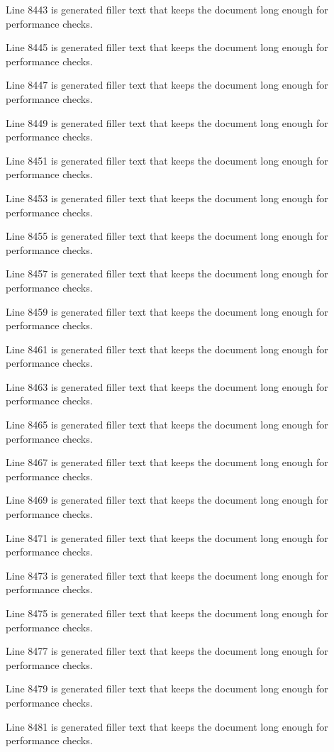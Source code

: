 Line 8443 is generated filler text that keeps the document long enough for performance checks.

Line 8445 is generated filler text that keeps the document long enough for performance checks.

Line 8447 is generated filler text that keeps the document long enough for performance checks.

Line 8449 is generated filler text that keeps the document long enough for performance checks.

Line 8451 is generated filler text that keeps the document long enough for performance checks.

Line 8453 is generated filler text that keeps the document long enough for performance checks.

Line 8455 is generated filler text that keeps the document long enough for performance checks.

Line 8457 is generated filler text that keeps the document long enough for performance checks.

Line 8459 is generated filler text that keeps the document long enough for performance checks.

Line 8461 is generated filler text that keeps the document long enough for performance checks.

Line 8463 is generated filler text that keeps the document long enough for performance checks.

Line 8465 is generated filler text that keeps the document long enough for performance checks.

Line 8467 is generated filler text that keeps the document long enough for performance checks.

Line 8469 is generated filler text that keeps the document long enough for performance checks.

Line 8471 is generated filler text that keeps the document long enough for performance checks.

Line 8473 is generated filler text that keeps the document long enough for performance checks.

Line 8475 is generated filler text that keeps the document long enough for performance checks.

Line 8477 is generated filler text that keeps the document long enough for performance checks.

Line 8479 is generated filler text that keeps the document long enough for performance checks.

Line 8481 is generated filler text that keeps the document long enough for performance checks.

